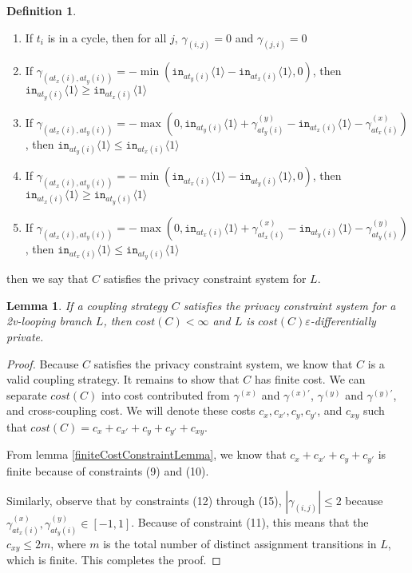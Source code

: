 \documentclass[12pt]{article}
\newcommand{\brangle}[1]{\langle #1 \rangle}
\newtheorem{lemma}[thm]{Lemma}
\theoremstyle{definition}
\newtheorem{defn}[thm]{Definition}
\begin{document}
\begin{defn}
\begin{enumerate}
        \item If $t_i$ is in a cycle, then for all $j$, $\gamma_{(i, j)} = 0$ and $\gamma_{(j, i)} = 0$
        \item If $\gamma_{(at_x(i), at_y(i))} = -\min(\texttt{in}_{at_y(i)}\brangle{1}-\texttt{in}_{at_x(i)}\brangle{1}, 0)$, then $\texttt{in}_{at_y(i)}\brangle{1}\geq \texttt{in}_{at_x(i)}\brangle{1}$
        \item If $\gamma_{(at_x(i), at_y(i))} = -\max(0, \texttt{in}_{at_y(i)}\brangle{1}+ \gamma_{at_y(i)}^{(y)}-\texttt{in}_{at_x(i)}\brangle{1}-\gamma_{at_x(i)}^{(x)})$, then $\texttt{in}_{at_y(i)}\brangle{1}\leq \texttt{in}_{at_x(i)}\brangle{1}$
        \item If $\gamma_{(at_x(i), at_y(i))} = -\min(\texttt{in}_{at_x(i)}\brangle{1}-\texttt{in}_{at_y(i)}\brangle{1}, 0)$, then $\texttt{in}_{at_x(i)}\brangle{1}\geq \texttt{in}_{at_y(i)}\brangle{1}$
        \item If $\gamma_{(at_x(i), at_y(i))} = -\max(0, \texttt{in}_{at_x(i)}\brangle{1}+ \gamma_{at_x(i)}^{(x)}-\texttt{in}_{at_y(i)}\brangle{1}-\gamma_{at_y(i)}^{(y)})$, then $\texttt{in}_{at_x(i)}\brangle{1}\leq \texttt{in}_{at_y(i)}\brangle{1}$
    \end{enumerate}
    then we say that $C$ satisfies the privacy constraint system for $L$. 
\end{defn}

\begin{lemma}
    If a coupling strategy $C$ satisfies the privacy constraint system for a 2v-looping branch $L$, then $cost(C)<\infty$ and $L$ is $cost(C)\varepsilon$-differentially private. 
\end{lemma}

\begin{proof}
    Because $C$ satisfies the privacy constraint system, we know that $C$ is a valid coupling strategy. It remains to show that $C$ has finite cost. We can separate $cost(C)$ into cost contributed from $\gamma^{(x)}$ and $\gamma^{(x)\prime}$, $\gamma^{(y)}$ and $\gamma^{(y)\prime}$, and cross-coupling cost. We will denote these costs $c_x, c_{x\prime}, c_y, c_{y\prime}$, and $c_{xy}$ such that $cost(C) = c_x + c_{x\prime}+c_y+c_{y\prime}+c_{xy}$.

    From lemma \ref{finiteCostConstraintLemma}, we know that $c_x + c_{x\prime}+c_y+c_{y\prime}$ is finite because of constraints (9) and (10). 

    Similarly, observe that by constraints (12) through (15), $|\gamma_{(i, j)}|\leq 2$ because $\gamma_{at_x(i)}^{(x)},\gamma_{at_y(i)}^{(y)}\in [-1, 1]$. Because of constraint (11), this means that the $c_{xy}\leq 2m$, where $m$ is the total number of distinct assignment transitions in $L$, which is finite. This completes the proof.
\end{proof}
\end{document}
